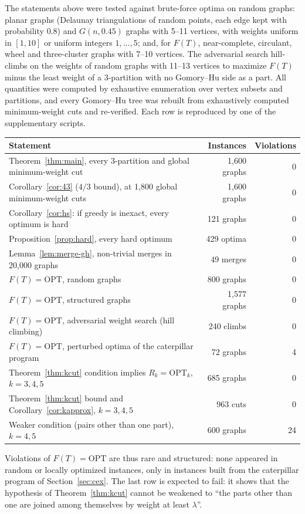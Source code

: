 \documentclass[preprint,12pt]{elsarticle}
\theoremstyle{definition}
\newcommand{\OPT}{\mathrm{OPT}}
\begin{document}
The statements above were tested against brute-force optima on random graphs: planar graphs
(Delaunay triangulations of random points, each edge kept with probability $0.8$) and $G(n,0.45)$
graphs with 5--11 vertices, with weights uniform in $[1,10]$ or uniform integers $1,\dots,5$; and, for
$F(T)$, near-complete, circulant, wheel and three-cluster graphs with 7--10 vertices. The adversarial
search hill-climbs on the weights of random graphs with 11--13 vertices to maximize $F(T)$ minus the
least weight of a 3-partition with no Gomory--Hu side as a part.
All quantities were computed by exhaustive enumeration over vertex subsets and partitions, and every
Gomory--Hu tree was rebuilt from exhaustively computed minimum-weight cuts and re-verified. Each row
is reproduced by one of the supplementary scripts.
\begin{center}
\begin{tabular}{p{}rr}
\toprule
Statement & Instances & Violations\\
\midrule
Theorem~\ref{thm:main}, every 3-partition and global minimum-weight cut & 1{,}600 graphs & 0\\
Corollary~\ref{cor:43} ($4/3$ bound), at 1{,}800 global minimum-weight cuts & 1{,}600 graphs & 0\\
Corollary~\ref{cor:hs}: if greedy is inexact, every optimum is hard & 121 graphs & 0\\
Proposition~\ref{prop:hard}, every hard optimum & 429 optima & 0\\
Lemma~\ref{lem:merge-gh}, non-trivial merges in 20{,}000 graphs & 49 merges & 0\\
$F(T)=\OPT$, random graphs & 800 graphs & 0\\
$F(T)=\OPT$, structured graphs & 1{,}577 graphs & 0\\
$F(T)=\OPT$, adversarial weight search (hill climbing) & 240 climbs & 0\\
$F(T)=\OPT$, perturbed optima of the caterpillar program & 72 graphs & 4\\
Theorem~\ref{thm:kcut} condition implies $R_k=\OPT_k$, $k=3,4,5$ & 685 graphs & 0\\
Theorem~\ref{thm:kcut} bound and Corollary~\ref{cor:kapprox}, $k=3,4,5$ & 963 cuts & 0\\
Weaker condition (pairs other than one part), $k=4,5$ & 600 graphs & 24\\
\bottomrule
\end{tabular}
\end{center}
Violations of $F(T)=\OPT$ are thus rare and structured: none appeared in random or locally optimized
instances, only in instances built from the caterpillar program of Section~\ref{sec:cex}. The last
row is expected to fail: it shows that the hypothesis of Theorem~\ref{thm:kcut} cannot be weakened
to ``the parts other than one are joined among themselves by weight at least $\lambda$''.
\end{document}
